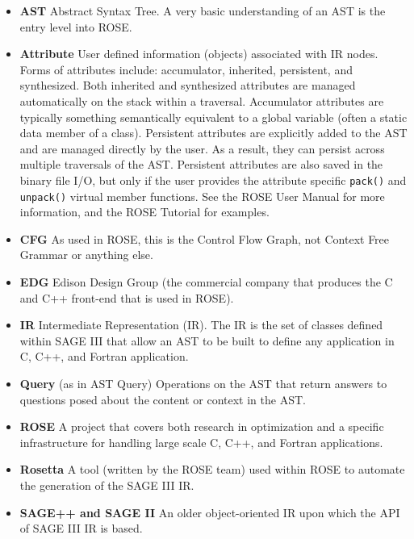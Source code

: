 \begin{itemize}
   \item {\bf AST} Abstract Syntax Tree. A very basic understanding of an AST is the
                   entry level into ROSE.

   \item {\bf Attribute} User defined information (objects) associated with IR nodes.
    Forms of attributes include: accumulator, inherited, persistent, and synthesized.
    Both inherited and synthesized attributes are managed automatically on the stack within a
    traversal.  Accumulator attributes are typically something semantically equivalent to a
    global variable (often a static data member of a class).  Persistent attributes 
    are explicitly added to the AST and are managed directly by the user.  As a result,
    they can persist across multiple traversals of the AST.  Persistent attributes are
    also saved in the binary file I/O, but only if the user provides the attribute
    specific {\tt pack()} and {\tt unpack()} virtual member functions.  See the ROSE
    User Manual for more information, and the ROSE Tutorial for examples.

   \item {\bf CFG} As used in ROSE, this is the Control Flow Graph, not Context Free
    Grammar or anything else.

   \item {\bf EDG} Edison Design Group (the commercial company that produces the C and C++
    front-end that is used in ROSE).

   \item {\bf IR} Intermediate Representation (IR).  The IR is the set of classes defined
    within SAGE III that allow an AST to be built to define any application in C, C++,
    and Fortran application.

   \item {\bf Query} (as in AST Query) Operations on the AST that return answers to
    questions posed about the content or context in the AST.

   \item {\bf ROSE} A project that covers both research in optimization and a specific
    infrastructure for handling large scale C, C++, and Fortran applications.

   \item {\bf Rosetta} A tool (written by the ROSE team) used within ROSE to automate the
    generation of the SAGE III IR.

   \item {\bf SAGE++ and SAGE II} An older object-oriented IR upon which the API of 
   SAGE III IR is based.


\end{itemize}
